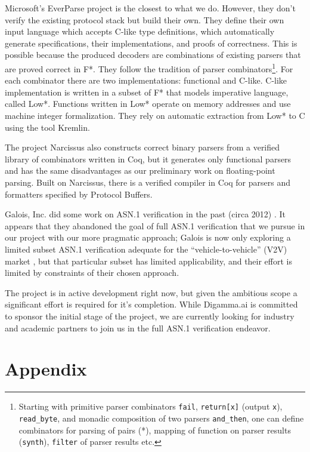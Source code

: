 \documentclass[10p,conference]{IEEEtran}
\begin{document}
Microsoft's EverParse project \cite{RamananandroDFS19} is the closest
to what we do. However, they don't verify the existing protocol stack but
build their own. They define their own input language which accepts
C-like type definitions, which automatically generate specifications, their implementations, and proofs of correctness. This is possible because the produced decoders are combinations of existing parsers that are proved correct in F*. They
follow the tradition of parser combinators\footnote{Starting with
  primitive parser combinators \texttt{fail}, \texttt{return[x]}
  (output \texttt{x}), \texttt{read\_byte}, and monadic composition of
  two parsers \texttt{and\_then}, one can define combinators for
  parsing of pairs (*), mapping of function on parser results
  (\texttt{synth}), \texttt{filter} of parser results etc.}. For each
combinator there are two implementations: functional and
C-like. C-like implementation is written in a subset of F* that models
imperative language, called Low*. Functions written in Low* operate on
memory addresses and use machine integer formalization. They rely on
automatic extraction from Low* to C using the tool Kremlin.

The project Narcissus \cite{Narcissus} also constructs correct binary parsers from a verified
library of combinators written in Coq, but it generates only functional
parsers and has the same disadvantages as our preliminary work on floating-point parsing. Built on Narcissus, there is a verified compiler in Coq for
parsers and formatters specified by Protocol Buffers.
 
Galois, Inc. did some work on ASN.1 verification in the past (circa
2012) \cite{ASN1FormalSem}. It appears that they abandoned the goal of
full ASN.1 verification \cite{ASN1EncDec} that we pursue in our
project with our more pragmatic approach; Galois is now only exploring
a limited subset ASN.1 verification adequate for the
``vehicle-to-vehicle'' (V2V) market \cite{V2V}, but that particular
subset has limited applicability, and their effort is limited by
constraints of their chosen approach.

The project is in active development right now, but given the
ambitious scope a significant effort is required for it's completion.
While Digamma.ai is committed to sponsor the initial stage of the
project, we are currently looking for industry and academic partners
to join us in the full ASN.1 verification endeavor.

\onecolumn
\appendix
\section{Appendix}
\end{document}
